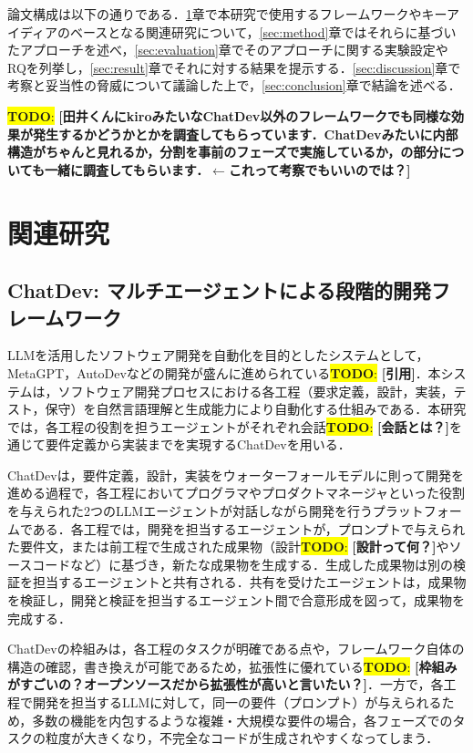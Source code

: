 \documentclass[submit,techrep,noauthor]{ipsj}
\newcommand{\todo}[1]{\colorbox{yellow}{{\bf TODO}:}{\color{red} {\textbf{[#1]}}}}
\begin{document}
論文構成は以下の通りである．\ref{sec:related}章で本研究で使用するフレームワークやキーアイディアのベースとなる関連研究について，\ref{sec:method}章ではそれらに基づいたアプローチを述べ，\ref{sec:evaluation}章でそのアプローチに関する実験設定やRQを列挙し，\ref{sec:result}章でそれに対する結果を提示する．\ref{sec:discussion}章で考察と妥当性の脅威について議論した上で，\ref{sec:conclusion}章で結論を述べる．

\todo{田井くんにkiroみたいなChatDev以外のフレームワークでも同様な効果が発生するかどうかとかを調査してもらっています．ChatDevみたいに内部構造がちゃんと見れるか，分割を事前のフェーズで実施しているか，の部分についても一緒に調査してもらいます．$\leftarrow$これって考察でもいいのでは？}


\section{関連研究}
\label{sec:related}

\subsection{ChatDev: マルチエージェントによる段階的開発フレームワーク}
LLMを活用したソフトウェア開発を自動化を目的としたシステムとして，MetaGPT，AutoDevなどの開発が盛んに進められている\todo{引用}．本システムは，ソフトウェア開発プロセスにおける各工程（要求定義，設計，実装，テスト，保守）を自然言語理解と生成能力により自動化する仕組みである．本研究では，各工程の役割を担うエージェントがそれぞれ会話\todo{会話とは？}を通じて要件定義から実装までを実現するChatDev\cite{qian-etal-2024-chatdev}を用いる．

ChatDevは，要件定義，設計，実装をウォーターフォールモデルに則って開発を進める過程で，各工程においてプログラマやプロダクトマネージャといった役割を与えられた2つのLLMエージェントが対話しながら開発を行うプラットフォームである．各工程では，開発を担当するエージェントが，プロンプトで与えられた要件文，または前工程で生成された成果物（設計\todo{設計って何？}やソースコードなど）に基づき，新たな成果物を生成する．生成した成果物は別の検証を担当するエージェントと共有される．共有を受けたエージェントは，成果物を検証し，開発と検証を担当するエージェント間で合意形成を図って，成果物を完成する．

ChatDevの枠組みは，各工程のタスクが明確である点や，フレームワーク自体の構造の確認，書き換えが可能であるため，拡張性に優れている\todo{枠組みがすごいの？オープンソースだから拡張性が高いと言いたい？}．一方で，各工程で開発を担当するLLMに対して，同一の要件（プロンプト）が与えられるため，多数の機能を内包するような複雑・大規模な要件の場合，各フェーズでのタスクの粒度が大きくなり，不完全なコードが生成されやすくなってしまう．
\end{document}
